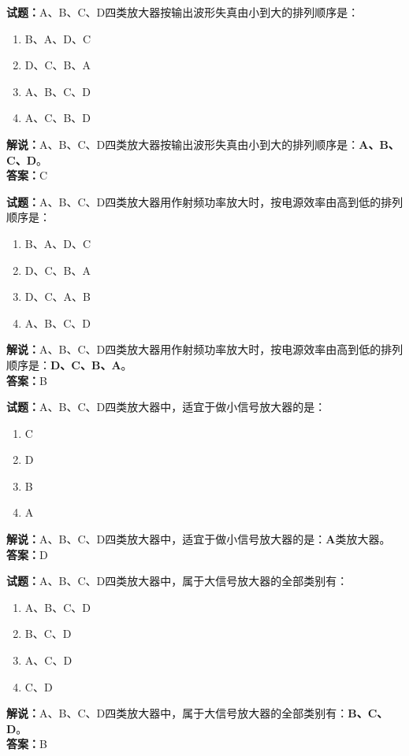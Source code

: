 \documentclass{ctexbook}
\begin{document}
\bigskip


\noindent\textbf{试题：}A、B、C、D四类放大器按输出波形失真由小到大的排列顺序是：
\begin{enumerate}[leftmargin=3em]
\item B、A、D、C
\item D、C、B、A
\item A、B、C、D
\item A、C、B、D
\end{enumerate}
\noindent\textbf{解说：}A、B、C、D四类放大器按输出波形失真由小到大的排列顺序是：\textbf{A、B、C、D}。\\\noindent\textbf{答案：}C





\bigskip


\noindent\textbf{试题：}A、B、C、D四类放大器用作射频功率放大时，按电源效率由高到低的排列顺序是：
\begin{enumerate}[leftmargin=3em]
\item B、A、D、C
\item D、C、B、A
\item D、C、A、B
\item A、B、C、D
\end{enumerate}
\noindent\textbf{解说：}A、B、C、D四类放大器用作射频功率放大时，按电源效率由高到低的排列顺序是：\textbf{D、C、B、A}。\\\noindent\textbf{答案：}B





\bigskip


\noindent\textbf{试题：}A、B、C、D四类放大器中，适宜于做小信号放大器的是：
\begin{enumerate}[leftmargin=3em]
\item C
\item D
\item B
\item A
\end{enumerate}
\noindent\textbf{解说：}A、B、C、D四类放大器中，适宜于做小信号放大器的是：\textbf{A}类放大器。\\\noindent\textbf{答案：}D






\bigskip


\noindent\textbf{试题：}A、B、C、D四类放大器中，属于大信号放大器的全部类别有：
\begin{enumerate}[leftmargin=3em]
\item A、B、C、D
\item B、C、D
\item A、C、D
\item C、D
\end{enumerate}
\noindent\textbf{解说：}A、B、C、D四类放大器中，属于大信号放大器的全部类别有：\textbf{B、C、D}。\\\noindent\textbf{答案：}B
\end{document}

